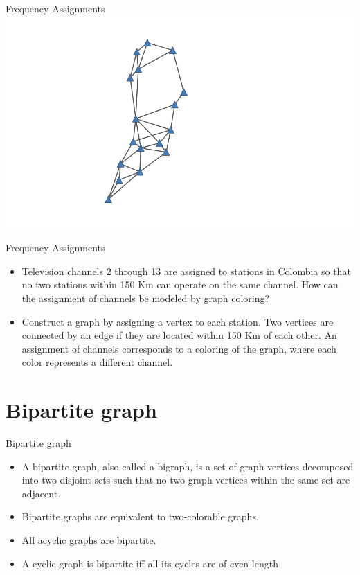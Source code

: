 \documentclass{beamer}
\theoremstyle{definition}
\begin{document}
\begin{frame}{Frequency Assignments}
    \centering \includegraphics[width=.9\linewidth]{col4.png}
\end{frame}

\begin{frame}{Frequency Assignments}
    \begin{itemize}
        \item Television channels 2 through 13 are assigned to stations in Colombia so that no two stations within 150 Km can operate on the same channel. How can the assignment of channels be modeled by graph coloring?
        \item Construct a graph by assigning a vertex to each station. Two vertices are connected by an edge if they are located within 150 Km of each other. An assignment of channels corresponds to a coloring of the graph, where each color represents a different channel.
    \end{itemize}
\end{frame}

\section{Bipartite graph}

\begin{frame}{Bipartite graph}
    \begin{itemize}
        \item A bipartite graph, also called a bigraph, is a set of graph vertices decomposed into two disjoint sets such that no two graph vertices within the same set are adjacent.
        \item Bipartite graphs are equivalent to two-colorable graphs. 
        \item All acyclic graphs are bipartite. 
        \item A cyclic graph is bipartite iff all its cycles are of even length
    \end{itemize}
\end{frame}
\end{document}
